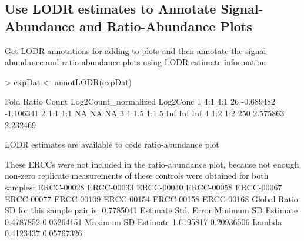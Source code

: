 \documentclass{article}
\begin{document}
\subsection{Use LODR estimates to Annotate Signal-Abundance and Ratio-Abundance Plots}
Get LODR annotations for adding to plots and then annotate the signal-abundance
and ratio-abundance plots using LODR estimate information 

\begin{Schunk}
\begin{Sinput}
> expDat <- annotLODR(expDat)
\end{Sinput}
\begin{Soutput}
   Fold Ratio Count Log2Count_normalized  Log2Conc
1   4:1   4:1    26            -0.689482 -1.106341
2   1:1   1:1    NA                   NA        NA
3 1:1.5 1:1.5   Inf                  Inf       Inf
4   1:2   1:2   250             2.575863  2.232469

LODR estimates are available to code ratio-abundance plot

These ERCCs were not included in the ratio-abundance plot, 
 because not enough non-zero replicate measurements of these 
 controls were obtained for both samples:
ERCC-00028
ERCC-00033
ERCC-00040
ERCC-00058
ERCC-00067
ERCC-00077
ERCC-00109
ERCC-00154
ERCC-00158
ERCC-00168
Global Ratio SD for this sample pair is: 0.7785041 
                     Estimate Std. Error
Minimum SD Estimate 0.4787852 0.03264151
Maximum SD Estimate 1.6195817 0.20936506
Lambda              0.4123437 0.05767326
\end{Soutput}
\end{Schunk}
\clearpage
\end{document}
